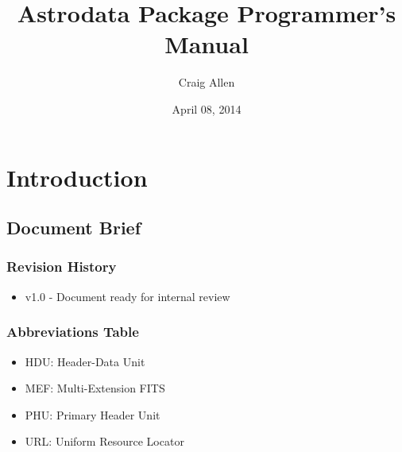 \documentclass[letterpaper,10pt,english]{sphinxmanual}
\title{Astrodata Package Programmer's Manual}
\date{April 08, 2014}
\author{Craig Allen}
\begin{document}
\maketitle
\setcounter{tocdepth}{6}
\tableofcontents
{}\label{index::doc}



\chapter{Introduction}
\label{chapter_intro:introduction}\label{chapter_intro:the-astrodata-manual}\label{chapter_intro::doc}

\section{Document Brief}
\label{documentBrief:document-brief}\label{documentBrief::doc}

\subsection{Revision History}
\label{gen.ADMANUAL_RevisionHistory:revision-history}\label{gen.ADMANUAL_RevisionHistory::doc}\begin{itemize}
\item {} 
v1.0 - Document ready for internal review

\end{itemize}


\subsection{Abbreviations Table}
\label{gen.ADMANUAL_Purpose::doc}\label{gen.ADMANUAL_Purpose:abbreviations-table}\begin{itemize}
\item {} 
HDU: Header-Data Unit

\item {} 
MEF: Multi-Extension FITS

\item {} 
PHU: Primary Header Unit

\item {} 
URL: Uniform Resource Locator

\end{itemize}
\end{document}
